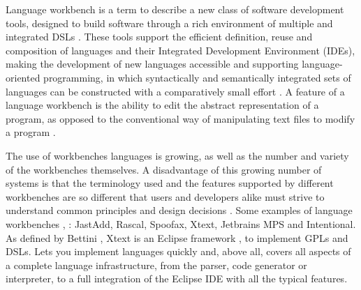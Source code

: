 Language workbench is a term to describe a new class of software development tools, designed to build software through a rich environment of multiple and integrated DSLs \cite{fowler2008}. These tools support the efficient definition, reuse and composition of languages and their Integrated Development Environment (IDEs), making the development of new languages accessible and supporting language-oriented programming, in which syntactically and semantically integrated sets of languages can be constructed with a comparatively small effort \cite{erdweg2013}. A feature of a language workbench is the ability to edit the abstract representation of a program, as opposed to the conventional way of manipulating text files to modify a program \cite{schmitt2014}.


The use of workbenches languages is growing, as well as the number and variety of the workbenches themselves. A disadvantage of this growing number of systems is that the terminology used and the features supported by different workbenches are so different that users and developers alike must strive to understand common principles and design decisions \cite{erdweg2015}. Some examples of language workbenches \cite{schmitt2014}, \cite{erdweg2013}: JastAdd, Rascal, Spoofax, Xtext, Jetbrains MPS and Intentional. As defined by Bettini \cite{bettini2016}, Xtext is an Eclipse framework \cite{gallardo2003}, \cite{kulkarni2015} to implement GPLs and DSLs. Lets you implement languages quickly and, above all, covers all aspects of a complete language infrastructure, from the parser, code generator or interpreter, to a full integration of the Eclipse IDE with all the typical features.


